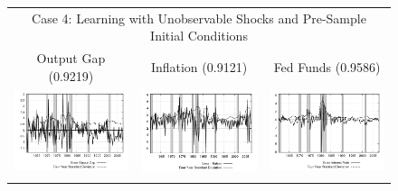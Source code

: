 \begin{figure}
\begin{tabular}{ccc}
\multicolumn{3}{c}{Case 4: Learning with Unobservable Shocks and Pre-Sample Initial Conditions} \\ 
Output Gap (0.9219) & Inflation (0.9121) & Fed Funds (0.9586) \\
\includegraphics[scale=0.28]{results_wlsinit/output_err.png} & 
\includegraphics[scale=0.28]{results_wlsinit/inflation_err.png} & 
\includegraphics[scale=0.28]{results_wlsinit/fedfunds_err.png} \\ \\ 
 
\end{tabular}
\end{figure}
